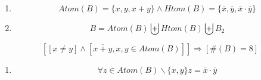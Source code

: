 \documentclass[
]{article}
\providecommand{\tightlist}{%
  \setlength{\itemsep}{0pt}\setlength{\parskip}{0pt}}
\begin{document}
\begin{enumerate}
\begin{enumerate}
\begin{enumerate}
\begin{enumerate}
\begin{enumerate}
\begin{enumerate}
            \begin{enumerate}
            \def\labelenumvii{\arabic{enumvii}.}
            \tightlist
            \item
              Supongamos \[{z = {\overline{x} \cdot \overline{y}}} = 0\]
            \item
              \[{z = \overline{x+y}} = 0\]
            \item
              \[{\overline{z} = {x + y}} = 1\]
            \item
              \[{x \cdot y} = 0\]
            \item
              \[{x = {\overline{y} \land y}} = \overline{x}\]
            \item
              \[{{\{{x,y}\}} \subseteq \mathit{Atom}}{{(B)} \cap \mathit{Htom}}{(B)}\]
            \item
              \[\mathit{Atom}{{(B)} \cap \mathit{Htom}}{{(B)} \neq \varnothing}\]
            \item
              \[{B \simeq {B_{4} \land \#}}{{(B)} = 8}\mathit{ABSURDO}\]
            \end{enumerate}
          \item
            \[{z \in \mathit{Atom}}{(B)}\]
          \item
            \[{\overline{x+y} \in \mathit{Atom}}{(B)}\]
          \item
            \[{{x + y} \in \mathit{Htom}}{(B)}\]
          \end{enumerate}
        \item
          \[\mathit{Atom}{{(B)} = {{\{{x,y,{x + y}}\}} \land \mathit{Htom}}}{{(B)} = {\{{\overline{x},\overline{y},{\overline{x} \cdot \overline{y}}}\}}}\]
        \item
          \[{B = \mathit{Atom}}{(B)}\biguplus\mathit{Htom}{(B)}\biguplus B_{2}\]
        \end{enumerate}
      \end{enumerate}

      \[\left\lbrack {\left\lbrack {x \neq y} \right\rbrack \land \left\lbrack {\overline{x+y},x,{y \in \mathit{Atom}}{(B)}} \right\rbrack} \right\rbrack\Rightarrow\left\lbrack {\#{{(B)} = 8}} \right\rbrack\]

      \begin{enumerate}
      \def\labelenumiv{\arabic{enumiv}.}
      \setcounter{enumiv}{7}
      \item
        \[\forall{z \in \mathit{Atom}}{{(B)} \smallsetminus {\{{x,y}\}}}{z = {\overline{x} \cdot \overline{y}}}\]


\end{enumerate}
\end{enumerate}
\end{enumerate}
\end{enumerate}
\end{document}
